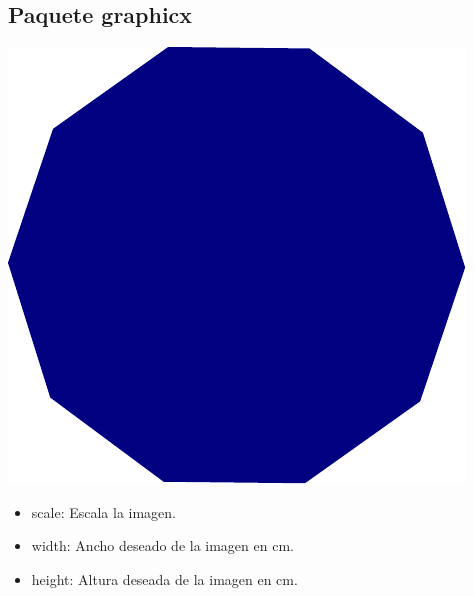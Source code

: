 \documentclass[12pt]{article}
\begin{document}
\subsection{Paquete graphicx}
\begin{center}
\includegraphics[scale=0.4]{figuras/imagen1.pdf}
\end{center}
\begin{itemize}
\item scale: Escala la imagen.
\item width: Ancho deseado de la imagen en cm.
\item height: Altura deseada de la imagen en cm.
\end{itemize}
\end{document}
